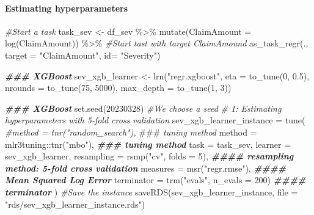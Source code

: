 \documentclass[
]{article}
\newenvironment{Shaded}{\begin{snugshade}}{\end{snugshade}}
\newcommand{\AlertTok}[1]{\textcolor[rgb]{0.94,0.16,0.16}{#1}}
\newcommand{\AttributeTok}[1]{\textcolor[rgb]{0.77,0.63,0.00}{#1}}
\newcommand{\CommentTok}[1]{\textcolor[rgb]{0.56,0.35,0.01}{\textit{#1}}}
\newcommand{\DecValTok}[1]{\textcolor[rgb]{0.00,0.00,0.81}{#1}}
\newcommand{\DocumentationTok}[1]{\textcolor[rgb]{0.56,0.35,0.01}{\textbf{\textit{#1}}}}
\newcommand{\FloatTok}[1]{\textcolor[rgb]{0.00,0.00,0.81}{#1}}
\newcommand{\FunctionTok}[1]{\textcolor[rgb]{0.00,0.00,0.00}{#1}}
\newcommand{\NormalTok}[1]{#1}
\newcommand{\OtherTok}[1]{\textcolor[rgb]{0.56,0.35,0.01}{#1}}
\newcommand{\SpecialCharTok}[1]{\textcolor[rgb]{0.00,0.00,0.00}{#1}}
\newcommand{\StringTok}[1]{\textcolor[rgb]{0.31,0.60,0.02}{#1}}
\begin{document}
\hypertarget{estimating-hyperparameters}{%
\paragraph{Estimating
hyperparameters}\label{estimating-hyperparameters}}

\begin{Shaded}
\begin{Highlighting}[]
\CommentTok{\#Start a task}
\NormalTok{task\_sev }\OtherTok{\textless{}{-}}\NormalTok{ df\_sev }\SpecialCharTok{\%\textgreater{}\%}
  \FunctionTok{mutate}\NormalTok{(}\AttributeTok{ClaimAmount =} \FunctionTok{log}\NormalTok{(ClaimAmount)) }\SpecialCharTok{\%\textgreater{}\%}
  \CommentTok{\#Start tast with target ClaimAmound}
  \FunctionTok{as\_task\_regr}\NormalTok{(.,}
               \AttributeTok{target =} \StringTok{"ClaimAmount"}\NormalTok{,}
               \AttributeTok{id=} \StringTok{"Severity"}\NormalTok{)}

\DocumentationTok{\#\#\# XGBoost}
\NormalTok{sev\_xgb\_learner }\OtherTok{\textless{}{-}} \FunctionTok{lrn}\NormalTok{(}\StringTok{"regr.xgboost"}\NormalTok{,}
                   \AttributeTok{eta =} \FunctionTok{to\_tune}\NormalTok{(}\DecValTok{0}\NormalTok{, }\FloatTok{0.5}\NormalTok{),}
                   \AttributeTok{nrounds =} \FunctionTok{to\_tune}\NormalTok{(}\DecValTok{75}\NormalTok{, }\DecValTok{5000}\NormalTok{),}
                   \AttributeTok{max\_depth =} \FunctionTok{to\_tune}\NormalTok{(}\DecValTok{1}\NormalTok{, }\DecValTok{3}\NormalTok{))}

\DocumentationTok{\#\#\# XGBoost}
\FunctionTok{set.seed}\NormalTok{(}\DecValTok{20230328}\NormalTok{) }\CommentTok{\#We choose a seed}
\CommentTok{\# 1: Estimating hyperparameters with 5{-}fold cross validation}
\NormalTok{sev\_xgb\_learner\_instance }\OtherTok{=} \FunctionTok{tune}\NormalTok{(}
  \CommentTok{\#method = tnr("random\_search"), }\AlertTok{\#\#\#}\CommentTok{ tuning method}
  \AttributeTok{method =}\NormalTok{ mlr3tuning}\SpecialCharTok{::}\FunctionTok{tnr}\NormalTok{(}\StringTok{"mbo"}\NormalTok{), }\DocumentationTok{\#\#\# tuning method}
  \AttributeTok{task =}\NormalTok{ task\_sev,}
  \AttributeTok{learner =}\NormalTok{ sev\_xgb\_learner,}
  \AttributeTok{resampling =} \FunctionTok{rsmp}\NormalTok{(}\StringTok{"cv"}\NormalTok{, }\AttributeTok{folds =} \DecValTok{5}\NormalTok{), }\DocumentationTok{\#\#\#\# resampling method: 5{-}fold cross validation}
  \AttributeTok{measures =} \FunctionTok{msr}\NormalTok{(}\StringTok{"regr.rmse"}\NormalTok{), }\DocumentationTok{\#\#\#\# Mean Squared Log Error}
  \AttributeTok{terminator =} \FunctionTok{trm}\NormalTok{(}\StringTok{"evals"}\NormalTok{, }\AttributeTok{n\_evals =} \DecValTok{200}\NormalTok{) }\DocumentationTok{\#\#\#\# terminator}
\NormalTok{)}
\CommentTok{\#Save the instance}
\FunctionTok{saveRDS}\NormalTok{(sev\_xgb\_learner\_instance, }\AttributeTok{file =} \StringTok{"rds/sev\_xgb\_learner\_instance.rds"}\NormalTok{)}
\end{Highlighting}
\end{Shaded}
\end{document}
